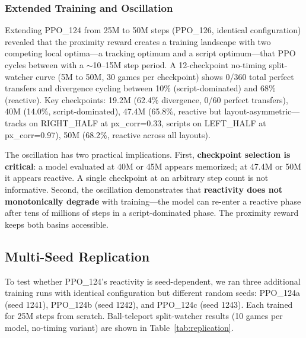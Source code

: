 \documentclass[11pt]{article}
\begin{document}
\subsubsection{Extended Training and Oscillation}
\label{sec:oscillation}

Extending PPO\_124 from 25M to 50M steps (PPO\_126, identical configuration)
revealed that the proximity reward creates a training landscape with two
competing local optima---a tracking optimum and a script optimum---that PPO
cycles between with a $\sim$10--15M step period. A 12-checkpoint no-timing
split-watcher curve (5M to 50M, 30 games per checkpoint) shows 0/360 total
perfect transfers and divergence cycling between 10\% (script-dominated) and
68\% (reactive). Key checkpoints: 19.2M (62.4\% divergence, 0/60 perfect
transfers), 40M (14.0\%, script-dominated), 47.4M (65.8\%, reactive but
layout-asymmetric---tracks on RIGHT\_HALF at px\_corr=0.33, scripts on
LEFT\_HALF at px\_corr=0.97), 50M (68.2\%, reactive across all layouts).

The oscillation has two practical implications. First,
\textbf{checkpoint selection is critical}: a model evaluated at 40M or 45M
appears memorized; at 47.4M or 50M it appears reactive. A single checkpoint at
an arbitrary step count is not informative. Second, the oscillation
demonstrates that \textbf{reactivity does not monotonically degrade} with
training---the model can re-enter a reactive phase after tens of millions of
steps in a script-dominated phase. The proximity reward keeps both basins
accessible.

\subsection{Multi-Seed Replication}
\label{sec:replication}

To test whether PPO\_124's reactivity is seed-dependent, we ran three
additional training runs with identical configuration but different random
seeds: PPO\_124a (seed 1241), PPO\_124b (seed 1242), and PPO\_124c (seed
1243). Each trained for 25M steps from scratch. Ball-teleport split-watcher
results (10 games per model, no-timing variant) are shown in
Table~\ref{tab:replication}.
\end{document}
